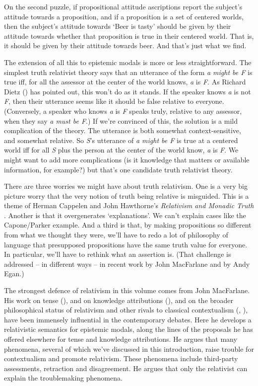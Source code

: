 \documentclass[
  10pt,
  letterpaper,
  DIV=11,
  numbers=noendperiod,
  twoside]{scrartcl}
\begin{document}
On the second puzzle, if propositional attitude ascriptions report the
subject's attitude towards a proposition, and if a proposition is a set
of centered worlds, then the subject's attitude towards `Beer is tasty'
should be given by their attitude towards whether that proposition is
true in their centered world. That is, it should be given by their
attitude towards beer. And that's just what we find.

The extension of all this to epistemic modals is more or less
straightforward. The simplest truth relativist theory says that an
utterance of the form \emph{a might be F} is true iff, for all the
assessor at the center of the world knows, \emph{a} is \emph{F}. As
Richard Dietz () has pointed out, this
won't do as it stands. If the speaker knows \emph{a} is not \emph{F},
then their utterance seems like it should be false relative to everyone.
(Conversely, a speaker who knows \emph{a} is \emph{F} speaks truly,
relative to any assessor, when they say \emph{a must be F}.) If we're
convinced of this, the solution is a mild complication of the theory.
The utterance is both somewhat context-sensitive, and somewhat relative.
So \emph{S}'s utterance of \emph{a might be F} is true at a centered
world iff for all \emph{S} plus the person at the center of the world
know, \emph{a} is \emph{F}. We might want to add more complications (is
it knowledge that matters or available information, for example?) but
that's one candidate truth relativist theory.

There are three worries we might have about truth relativism. One is a
very big picture worry that the very notion of truth being relative is
misguided. This is a theme of Herman Cappelen and John Hawthorne's
\emph{Relativism and Monadic Truth} . Another is that it overgenerates
`explanations'. We can't explain cases like the Capone/Parker example.
And a third is that, by making propositions so different from what we
thought they were, we'll have to redo a lot of philosophy of language
that presupposed propositions have the same truth value for everyone. In
particular, we'll have to rethink what an assertion is. (That challenge
is addressed -- in different ways -- in recent work by John MacFarlane
and by Andy Egan.)

The strongest defence of relativism in this volume comes from John
MacFarlane. His work on tense
(), and on
knowledge attributions
(), and on the
broader philosophical status of relativism and other rivals to classical
contextualism (,
), have been immensely
influential in the contemporary debates. Here he develops a relativistic
semantics for epistemic modals, along the lines of the proposals he has
offered elsewhere for tense and knowledge attributions. He argues that
many phenomena, several of which we've discussed in this introduction,
raise trouble for contextualism and promote relativism. These phenomena
include third-party assessments, retraction and disagreement. He argues
that only the relativist can explain the troublemaking phenomena.
\end{document}
